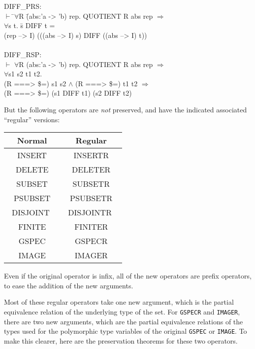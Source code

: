 \documentclass[envcountsame,runningheads]{llncs}
\begin{document}
{\tt \begin{tabbing}
DIFF\_PRS: \\
\hspace{5.5mm}
    $\vdash$ \=$\forall$R \=(abs:'a -> 'b) rep. QUOTIENT R abs rep $\Rightarrow$ \\
\>\>     $\forall$s t. \=s DIFF t = \\
\>\>\>     (rep --> I) (((abs --> I) s) DIFF ((abs --> I) t)) \\
\\
DIFF\_RSP: \\
\hspace{5.5mm}
    $\vdash$ $\forall$R (abs:'a -> 'b) rep. QUOTIENT R abs rep $\Rightarrow$ \\
\>\>     $\forall$s1 s2 t1 t2. \\
\>\>\>     (R ===> \$=) s1 s2 $\wedge$ (R ===> \$=) t1 t2 $\Rightarrow$ \\
\>\>\>     (R ===> \$=) (s1 DIFF t1) (s2 DIFF t2)
\end{tabbing}}

But  the following operators are {\it not\/} preserved, and have the indicated
associated ``regular'' versions:

\begin{center}
{\tt \begin{tabular}{|c|c|}
\hline
{\rm Normal} & {\rm Regular} \\
\hline
INSERT   & INSERTR \\
DELETE   & DELETER  \\
SUBSET   & SUBSETR \\
PSUBSET  & PSUBSETR \\
\ DISJOINT \ & \ DISJOINTR \  \\
FINITE   & FINITER  \\
GSPEC    & GSPECR  \\
IMAGE    & IMAGER  \\
\hline
\end{tabular}}
\end{center}

Even if the original operator is infix, all of the new operators
are prefix operators, to ease the addition of the new arguments.

Most of these regular operators take one new argument, which is the
partial equivalence relation of the underlying type of the set.
For {\tt GSPECR} and {\tt IMAGER}, there are two new arguments,
which are the partial equivalence relations of
the types used for the polymorphic type variables of the original
{\tt GSPEC} or {\tt IMAGE}.  To make this clearer, here are the
preservation theorems for these two operators.
\end{document}
